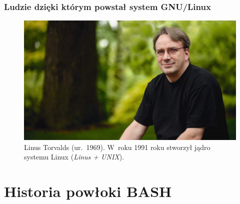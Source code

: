 \documentclass[10pt,t]{beamer}
\begin{document}
\begin{frame}
  \frametitle{Ludzie dzięki którym powstał system GNU/Linux}


  \begin{figure}

    \centering


    \includegraphics[scale=0.286]
    {./PresentationsPictures/OS-heroes-Pictures/Linus-Torvalds.jpg}

    \caption{Linus Torvalds (ur.~1969). W~roku 1991 roku stworzył jądro
      systemu Linux (\textit{Linus + UNIX}).}

    \label{fig:Linus-Torvalds}

  \end{figure}

\end{frame}










\section{Historia powłoki BASH}
\end{document}
